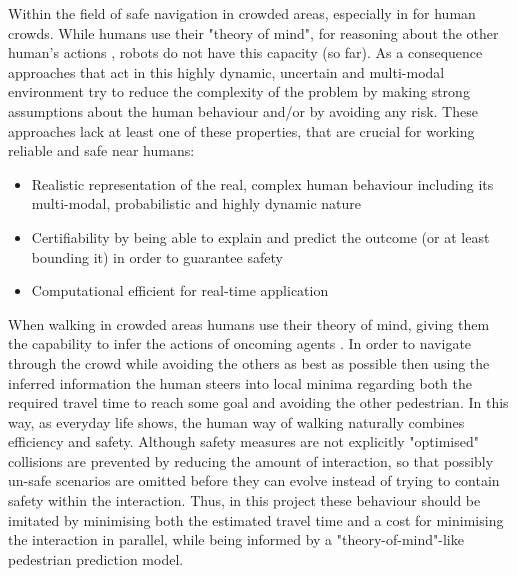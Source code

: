 Within the field of safe navigation in crowded areas, especially in for human crowds. While humans use their "theory of mind", for reasoning about the other human's actions \cite{Gweon2013}, robots do not have this capacity (so far). As a consequence approaches that act in this highly dynamic, uncertain and multi-modal environment try to reduce the complexity of the problem by making strong assumptions about the human behaviour and/or by avoiding any risk. These approaches lack at least one of these properties, that are crucial for working reliable and safe near humans: 

\begin{itemize}
\item Realistic representation of the real, complex human behaviour including its multi-modal, probabilistic and highly dynamic nature
\item Certifiability by being able to explain and predict the outcome (or at least bounding it) in order to guarantee safety 
\item Computational efficient for real-time application
\end{itemize}

When walking in crowded areas humans use their theory of mind, giving them the capability to infer the actions of oncoming agents \cite{Ivanovic2018} \cite{Gweon2013}. In order to navigate through the crowd while avoiding the others as best as possible then using the inferred information the human steers into local minima regarding both the required travel time to reach some goal and avoiding the other pedestrian. In this way, as everyday life shows, the human way of walking naturally combines efficiency and safety. Although safety measures are not explicitly "optimised" collisions are prevented by reducing the amount of interaction, so that possibly un-safe scenarios are omitted before they can evolve instead of trying to contain safety within the interaction. Thus, in this project these behaviour should be imitated by minimising both the estimated travel time and a cost for minimising the interaction in parallel, while being informed by a "theory-of-mind"-like pedestrian prediction model. 


